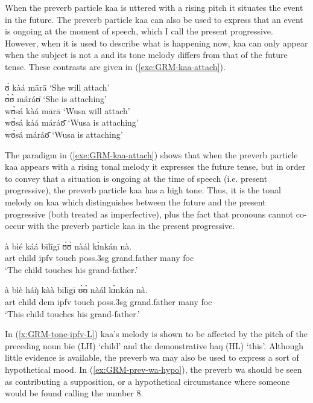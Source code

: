 \begin{exe}
\begin{exe}
\begin{exe}
\begin{exe}
\begin{exe}
\begin{exe}
\begin{exe}
\begin{exe}
\begin{exe}
\begin{exe}
\begin{exe}
When the preverb particle {\sls kaa} is uttered with a rising pitch it situates the event in the future. The preverb particle {\sls kaa} can also be used to express that an event is ongoing at the moment of speech, which I call the present progressive.   However,  when it is used to describe what is happening now, {\sls kaa} can only appear when the subject is not a  and its tone melody differs from that of the future tense. These contrasts are given in (\ref{exe:GRM-kaa-attach}).

\ea\label{exe:GRM-kaa-attach}
 ʊ̀ kàá mārā   {\rm `She will attach'}\\
   ʊ̀ʊ̀ máráʊ̄   {\rm  `She  is attaching'}\\
wʊ̀sá kàá mārā   {\rm  `Wusa will attach'}\\
wʊ̀sá káá   máráʊ̄  {\rm  `Wusa is attaching'}\\
\textasteriskcentered  wʊ̀sá   máráʊ̄   {\rm `Wusa is
attaching'}
\z

The paradigm in  (\ref{exe:GRM-kaa-attach}) shows that when the preverb particle {\sls kaa} appears with a rising tonal melody it  expresses the future tense, but  in order to convey that a situation is ongoing at the time of speech (i.e. present progressive), the preverb particle {\sls kaa} has a high tone. Thus, it is the tonal melody on {\sls kaa}  which distinguishes between the future and the present progressive (both treated as imperfective),  plus the fact that pronouns cannot co-occur with the preverb particle {\sls kaa} in the present progressive.

\ea\label{x:GRM-tone-ipfv}
\ea\label{x:GRM-tone-ipfv-H}
\gll à bìé káá bīlīgī ʊ̀ʊ̀ nàál kɪ̀nkán nà.\\
{\sc art} child {\sc ipfv} touch {\sc poss.3sg} grand.father many  {\sc 
foc}\\
\glt `The child touches his grand-father.'

\ex\label{x:GRM-tone-ipfv-L}
\gll à bìè háŋ̀ kàà bīlīgī ʊ̀ʊ̀ nàál kɪ̀nkán nà.\\
{\sc art} child {\sc dem} {\sc ipfv} touch {\sc poss.3sg} grand.father  many   {\sc 
foc}\\
\glt `This child touches his grand-father.'

\z
\z


 In (\ref{x:GRM-tone-ipfv-L}) {\sls kaa}'s melody is shown to be affected by   the pitch  of   the  preceding  noun {\sls bie} (LH) `child' and the demonstrative {\sls haŋ} (HL) `this'.  Although little evidence is available, the preverb {\sls wa} may also be used to
express a sort of hypothetical  mood.  In  (\ref{ex:GRM-prev-wa-hypo}), the
preverb {\sls wa} should be seen as contributing a supposition, or a 
hypothetical
circumstance where
someone would be found calling the number 8. 


\end{exe}
\end{exe}
\end{exe}
\end{exe}
\end{exe}
\end{exe}
\end{exe}
\end{exe}
\end{exe}
\end{exe}
\end{exe}
